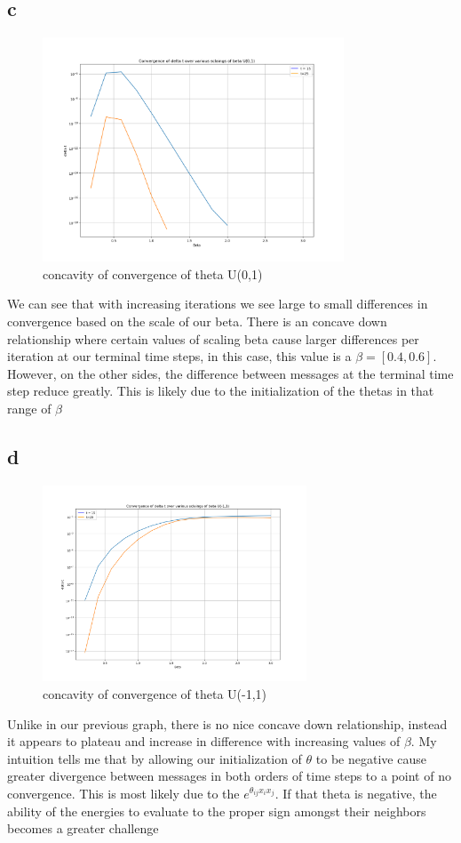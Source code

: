 \documentclass[12pt]{article}
\begin{document}
\subsection{c}
\begin{figure}[H]
	\includegraphics[width=0.8\textwidth]{q4_2_narrow.png}
	\caption{concavity of convergence of theta U(0,1)}
\end{figure}

We can see that with increasing iterations we see large to small differences in convergence based on the scale of our beta. There is an concave down relationship where certain values of scaling beta cause larger differences per iteration at our terminal time steps, in this case, this value is a $\beta = [0.4,0.6]$. However, on the other sides, the difference between messages at the terminal time step reduce greatly. This is likely due to the initialization of the thetas in that range of $\beta$
\subsection{d}
\begin{figure}[H]
	\includegraphics[width=0.7\textwidth]{q4_2_large.png}
	\caption{concavity of convergence of theta U(-1,1)}
\end{figure}
Unlike in our previous graph, there is no nice concave down relationship, instead it appears to plateau and increase in difference with increasing values of $\beta$. My intuition tells me that by allowing our initialization of $\theta$ to be negative cause greater divergence between messages in both orders of time steps to a point of no convergence. This is most likely due to the $e^{\theta_{ij}x_ix_j}$. If that theta is negative, the ability of the energies to evaluate to the proper sign amongst their neighbors becomes a greater challenge
\end{document}
